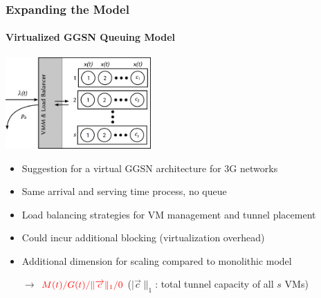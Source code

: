 \documentclass{beamer}
\begin{document}
\begin{frame}
	\frametitle{Expanding the Model}
	\framesubtitle{Virtualized GGSN Queuing Model}
		\begin{center}
			\includegraphics[height=3.5cm]{extras/ggsn-virtualized.png}
		\end{center}

		\begin{itemize}
			\item Suggestion for a virtual GGSN architecture for 3G networks
			\item Same arrival and serving time process, no queue
			\item Load balancing strategies for VM management and tunnel placement
			\item Could incur additional blocking (virtualization overhead)
			\item Additional dimension for scaling compared to monolithic model
			\item[$\rightarrow$] $\color{red}M(t)/G(t)/\|\overrightarrow{c}\|_1/0$ ($|\overrightarrow{c}\|_1$: total tunnel capacity of all $s$ VMs) %
		\end{itemize}
\end{frame}
\end{document}
